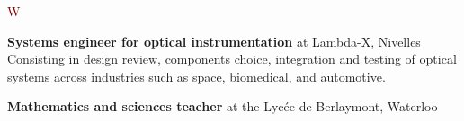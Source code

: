 \documentclass[9pt,a4paper]{article}
\begin{document}
\begin{cv}{}
\begin{cvlist}{\textcolor{Maroon}{W}}
			\item[2018 $\rightarrow$ 2021] \textbf{Systems engineer for optical instrumentation} at Lambda-X, Nivelles\\
			Consisting in design review, components choice, integration and testing of optical systems across industries such as space, biomedical, and automotive.%
	        \item[2017 $\rightarrow$ 2018] \textbf{Mathematics and sciences teacher} at the Lyc\'ee de Berlaymont, Waterloo
        \end{cvlist}
                

\end{cv}
\end{document}
